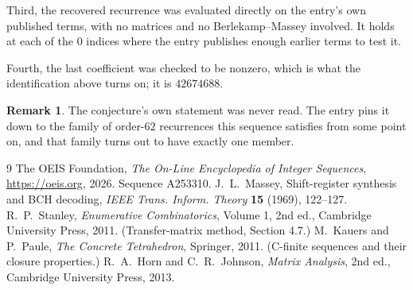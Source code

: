 \documentclass[11pt,a4paper]{article}
\theoremstyle{plain}
\theoremstyle{definition}
\newtheorem{remark}[theorem]{Remark}
\begin{document}
Third, the recovered recurrence was evaluated directly on the entry's own published terms, with
no matrices and no Berlekamp--Massey involved. It holds at each of the $0$ indices where
the entry publishes enough earlier terms to test it.

Fourth, the last coefficient was checked to be nonzero, which is what the identification above
turns on; it is $42674688$.

\begin{remark}
The conjecture's own statement was never read. The entry pins it down to the family of
order-$62$ recurrences this sequence satisfies from some point on, and that family turns
out to have exactly one member.
\end{remark}

\begin{thebibliography}{9}
 The OEIS Foundation, \emph{The On-Line Encyclopedia of Integer
Sequences}, \url{https://oeis.org}, 2026. Sequence A253310.
 J.~L.~Massey, Shift-register synthesis and BCH decoding, \emph{IEEE
Trans. Inform. Theory} \textbf{15} (1969), 122--127.
 R.~P.~Stanley, \emph{Enumerative Combinatorics}, Volume 1, 2nd ed.,
Cambridge University Press, 2011. (Transfer-matrix method, Section 4.7.)
 M.~Kauers and P.~Paule, \emph{The Concrete Tetrahedron}, Springer, 2011.
(C-finite sequences and their closure properties.)
 R.~A.~Horn and C.~R.~Johnson, \emph{Matrix Analysis}, 2nd ed., Cambridge
University Press, 2013.
\end{thebibliography}
\end{document}
